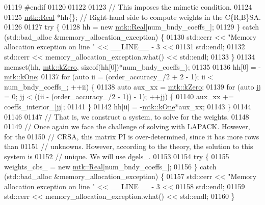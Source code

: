 \begin{DoxyCode}
{{01119 \textcolor{preprocessor}{  #endif}
01120 
01122 
01123   \textcolor{comment}{// This imposes the mimetic condition.}
01124 
01125   \hyperlink{group__c01-roots_gac080bbbf5cbb5502c9f00405f894857d}{mtk::Real} *hh\{\};  \textcolor{comment}{// Right-hand side to compute weights in the C\{R,B\}SA.}
01126 
01127   \textcolor{keywordflow}{try} \{
01128     hh = \textcolor{keyword}{new} \hyperlink{group__c01-roots_gac080bbbf5cbb5502c9f00405f894857d}{mtk::Real}[num\_bndy\_coeffs\_];
01129   \} \textcolor{keywordflow}{catch} (std::bad\_alloc &memory\_allocation\_exception) \{
01130     std::cerr << \textcolor{stringliteral}{"Memory allocation exception on line "} << \_\_LINE\_\_ - 3 <<
01131       std::endl;
01132     std::cerr << memory\_allocation\_exception.what() << std::endl;
01133   \}
01134   memset(hh, \hyperlink{group__c01-roots_ga59a451a5fae30d59649bcda274fea271}{mtk::kZero}, \textcolor{keyword}{sizeof}(hh[0])*num\_bndy\_coeffs\_);
01135 
01136   hh[0] = -\hyperlink{group__c01-roots_ga26407c24d43b6b95480943340d285c71}{mtk::kOne};
01137   \textcolor{keywordflow}{for} (\textcolor{keyword}{auto} ii = (order\_accuracy\_/2 + 2 - 1); ii < num\_bndy\_coeffs\_; ++ii) \{
01138     \textcolor{keyword}{auto} aux\_xx = \hyperlink{group__c01-roots_ga59a451a5fae30d59649bcda274fea271}{mtk::kZero};
01139     \textcolor{keywordflow}{for} (\textcolor{keyword}{auto} jj = 0; jj < ((ii - (order\_accuracy\_/2 - 1)) - 1); ++jj) \{
01140       aux\_xx += coeffs\_interior\_[jj];
01141     \}
01142     hh[ii] = -\hyperlink{group__c01-roots_ga26407c24d43b6b95480943340d285c71}{mtk::kOne}*aux\_xx;
01143   \}
01144 
01146 
01147   \textcolor{comment}{// That is, we construct a system, to solve for the weights.}
01148 
01149   \textcolor{comment}{// Once again we face the challenge of solving with LAPACK. However, for the}
01150   \textcolor{comment}{// CRSA, this matrix PI is over-determined, since it has more rows than}
01151   \textcolor{comment}{// unknowns. However, according to the theory, the solution to this system is}
01152   \textcolor{comment}{// unique. We will use dgels\_.}
01153 
01154   \textcolor{keywordflow}{try} \{
01155     weights\_cbs\_ = \textcolor{keyword}{new} \hyperlink{group__c01-roots_gac080bbbf5cbb5502c9f00405f894857d}{mtk::Real}[num\_bndy\_coeffs\_];
01156   \} \textcolor{keywordflow}{catch} (std::bad\_alloc &memory\_allocation\_exception) \{
01157     std::cerr << \textcolor{stringliteral}{"Memory allocation exception on line "} << \_\_LINE\_\_ - 3 <<
01158       std::endl;
01159     std::cerr << memory\_allocation\_exception.what() << std::endl;
01160   \}
}}
\end{DoxyCode}
